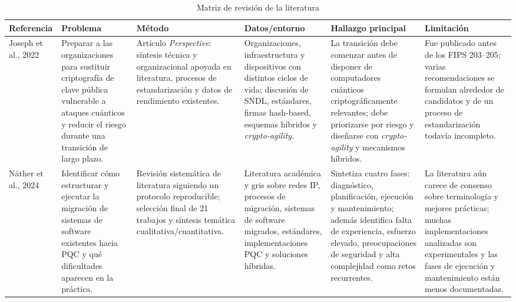 \begin{table}[t]
\caption{Matriz de revisión de la literatura}
\label{tab:matriz}
\centering
\scriptsize
\renewcommand{\arraystretch}{1.15}
\setlength{\tabcolsep}{3pt}
\begin{tabularx}{\textwidth}{>{\raggedright\arraybackslash}p{} >{\raggedright\arraybackslash}p{} >{\raggedright\arraybackslash}p{} >{\raggedright\arraybackslash}p{} >{\raggedright\arraybackslash}X >{\raggedright\arraybackslash}p{}}
\toprule
\textbf{Referencia} & \textbf{Problema} & \textbf{Método} & \textbf{Datos/entorno} & \textbf{Hallazgo principal} & \textbf{Limitación} \\
\midrule

Joseph et al., 2022 \cite{joseph2022transitioning} & Preparar a las organizaciones para sustituir criptografía de clave pública vulnerable a ataques cuánticos y reducir el riesgo durante una transición de largo plazo. & Artículo \textit{Perspective}: síntesis técnica y organizacional apoyada en literatura, procesos de estandarización y datos de rendimiento existentes. & Organizaciones, infraestructura y dispositivos con distintos ciclos de vida; discusión de SNDL, estándares, firmas hash-based, esquemas híbridos y \textit{crypto-agility}. & La transición debe comenzar antes de disponer de computadores cuánticos criptográficamente relevantes; debe priorizarse por riesgo y diseñarse con \textit{crypto-agility} y mecanismos híbridos. & Fue publicado antes de los FIPS 203--205; varias recomendaciones se formulan alrededor de candidatos y de un proceso de estandarización todavía incompleto. \\

Näther et al., 2024 \cite{naether2024migrating} & Identificar cómo estructurar y ejecutar la migración de sistemas de software existentes hacia PQC y qué dificultades aparecen en la práctica. & Revisión sistemática de literatura siguiendo un protocolo reproducible; selección final de 21 trabajos y síntesis temática cualitativa/cuantitativa. & Literatura académica y gris sobre redes IP, procesos de migración, sistemas de software migrados, estándares, implementaciones PQC y soluciones híbridas. & Sintetiza cuatro fases: diagnóstico, planificación, ejecución y mantenimiento; además identifica falta de experiencia, esfuerzo elevado, preocupaciones de seguridad y alta complejidad como retos recurrentes. & La literatura aún carece de consenso sobre terminología y mejores prácticas; muchas implementaciones analizadas son experimentales y las fases de ejecución y mantenimiento están menos documentadas. \\


\end{tabularx}
\end{table}
